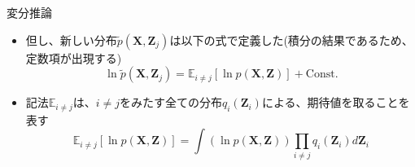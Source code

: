 \documentclass[dvipdfmx,notheorems,t]{beamer}
\begin{document}
\begin{frame}{変分推論}
\begin{itemize}
\begin{itemize}
		\item 但し、新しい分布$\widetilde{p}(\bm{X}, \bm{Z}_j)$は以下の式で定義した(積分の結果であるため、定数項が出現する)
		\begin{equation}
			\ln \widetilde{p}(\bm{X}, \bm{Z}_j) = \mathbb{E}_{i \neq j}[\ln p(\bm{X}, \bm{Z})] + \mathrm{Const.}
		\end{equation}
		
		\item 記法$\mathbb{E}_{i \neq j}$は、$i \neq j$をみたす全ての分布$q_i(\bm{Z}_i)$による、期待値を取ることを表す
		\begin{equation}
			\mathbb{E}_{i \neq j}[\ln p(\bm{X}, \bm{Z})] = \int \left( \ln p(\bm{X}, \bm{Z}) \right) \prod_{i \neq j} q_i(\bm{Z}_i) d\bm{Z}_i
		\end{equation}
		

\end{itemize}
\end{itemize}
\end{frame}
\end{document}
